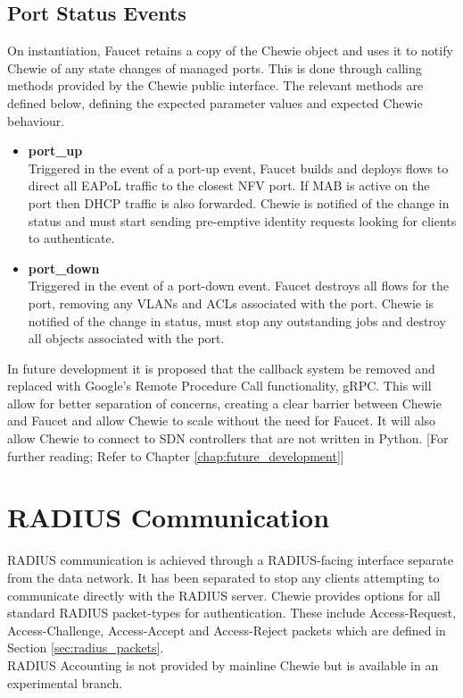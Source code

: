 \subsection{Port Status Events}
On instantiation, Faucet retains a copy of the Chewie object and uses it to notify Chewie of any state changes of managed ports. This is done through calling methods provided by the Chewie public interface. The relevant methods are defined below, defining the expected parameter values and expected Chewie behaviour.
\begin{itemize}
    \item \textbf{port\_up}\\
        Triggered in the event of a port-up event, Faucet builds and deploys flows to direct all EAPoL traffic to the closest NFV port. If MAB is active on the port then DHCP traffic is also forwarded. Chewie is notified of the change in status and must start sending pre-emptive identity requests looking for clients to authenticate.
    \item \textbf{port\_down}\\
        Triggered in the event of a port-down event. Faucet destroys all flows for the port, removing any VLANs and ACLs associated with the port. Chewie is notified of the change in status, must stop any outstanding jobs and destroy all objects associated with the port.
\end{itemize}

In future development it is proposed that the callback system be removed and replaced with Google's Remote Procedure Call functionality, gRPC\cite{grpc_website}. This will allow for better separation of concerns, creating a clear barrier between Chewie and Faucet and allow Chewie to scale without the need for Faucet. It will also allow Chewie to connect to SDN controllers that are not written in Python. [For further reading; Refer to Chapter \ref{chap:future_development}]

\section{RADIUS Communication}
RADIUS communication is achieved through a RADIUS-facing interface separate from the data network. It has been separated to stop any clients attempting to communicate directly with the RADIUS server. 
Chewie provides options for all standard RADIUS packet-types for authentication. These include Access-Request, Access-Challenge, Access-Accept and Access-Reject packets which are defined in Section \ref{sec:radius_packets}.\\
RADIUS Accounting \cite{radius_accounting} is not provided by mainline Chewie but is available in an experimental branch. \cite{chewie_radius_accounting}\\

